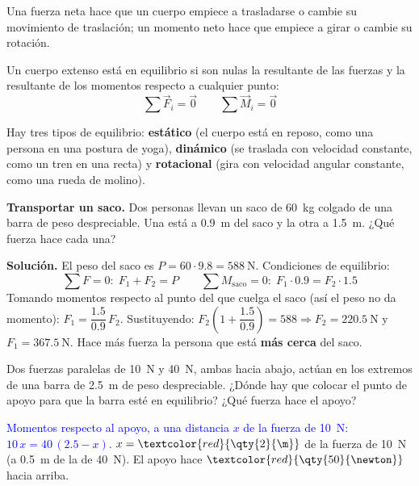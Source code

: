 Una fuerza neta hace que un cuerpo empiece a trasladarse o cambie su movimiento de traslación; un momento neto hace que empiece a
girar o cambie su rotación.

\begin{definition}
    Un cuerpo extenso está en equilibrio si son nulas la resultante de las fuerzas y la resultante de los momentos respecto a
    cualquier punto:
    \[ \sum \vec{F}_i = \vec{0} \qquad \sum \vec{M}_i = \vec{0} \]
\end{definition}

\begin{remark}
    Hay tres tipos de equilibrio: \textbf{estático} (el cuerpo está en reposo, como una persona en una postura de yoga),
    \textbf{dinámico} (se traslada con velocidad constante, como un tren en una recta) y \textbf{rotacional} (gira con velocidad angular
    constante, como una rueda de molino).
\end{remark}

\begin{example}
    \textbf{Transportar un saco.} Dos personas llevan un saco de \qty{60}{\kg} colgado de una barra de peso despreciable. Una está a
    \qty{0.9}{\m} del saco y la otra a \qty{1.5}{\m}. ¿Qué fuerza hace cada una?

    \textbf{Solución.} El peso del saco es \(P = 60 \cdot \num{9.8} = \qty{588}{\newton}\). Condiciones de equilibrio:
    \[ \sum F = 0:\; F_1 + F_2 = P \qquad \sum M_{\text{saco}} = 0:\; F_1 \cdot \num{0.9} = F_2 \cdot \num{1.5} \]
    Tomando momentos respecto al punto del que cuelga el saco (así el peso no da momento):
    \(F_1 = \dfrac{\num{1.5}}{\num{0.9}}\,F_2\). Sustituyendo: \(F_2\left(1 + \dfrac{\num{1.5}}{\num{0.9}}\right) = 588 \Rightarrow
    F_2 = \qty{220.5}{\newton}\) y \(F_1 = \qty{367.5}{\newton}\). Hace más fuerza la persona que está \textbf{más cerca} del saco.
\end{example}

\begin{exercise}
    Dos fuerzas paralelas de \qty{10}{\newton} y \qty{40}{\newton}, ambas hacia abajo, actúan en los extremos de una barra de
    \qty{2.5}{\m} de peso despreciable. ¿Dónde hay que colocar el punto de apoyo para que la barra esté en equilibrio? ¿Qué fuerza
    hace el apoyo?
    \begin{solu}
        \textcolor{blue}{Momentos respecto al apoyo, a una distancia \(x\) de la fuerza de \qty{10}{\newton}: \(10\,x = 40\,(\num{2.5} - x)\).}
        \(x = \textcolor{red}{\qty{2}{\m}}\) de la fuerza de \qty{10}{\newton} (a \qty{0.5}{\m} de la de \qty{40}{\newton}). El
        apoyo hace \(\textcolor{red}{\qty{50}{\newton}}\) hacia arriba.
    \end{solu}
\end{exercise}

